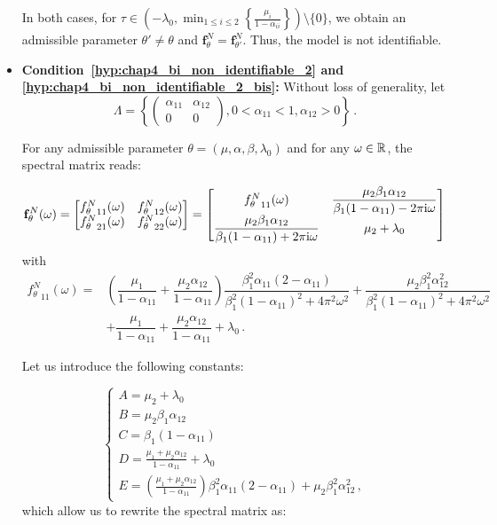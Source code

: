 \begin{subappendices}
\begin{itemize}
In both cases, for $\tau \in\left(-\lambda_0, \min_{1\leq i \leq 2}\left\{\frac{\mu_i}{1-\alpha_{ii}}\right\} \right)\setminus\{0\}$, we obtain an admissible parameter $\theta' \neq \theta$ and
$\mathbf{f}_\theta^N = \mathbf{f}_{\theta'}^N$.
Thus, the model is not identifiable.






\item \textbf{Condition~\ref{hyp:chap4_bi_non_identifiable_2} and \ref{hyp:chap4_bi_non_identifiable_2_bis}:} 
Without loss of generality, let 
\[\Lambda = \left\{ \begin{pmatrix} \alpha_{11} & \alpha_{12} \\ 0 & 0 \end{pmatrix}, 0 < \alpha_{11} < 1, \alpha_{12} > 0 \right\}\,.\] 

For any admissible parameter $\theta = (\mu, \alpha, \beta, \lambda_0)$ and for any $\omega\in{\mathbb R}$, the spectral matrix reads: 

\begin{equation*}
\mathbf{f}_\theta^N(\omega) = 
\begin{bmatrix}
  {f_\theta^N}_{11}(\omega) & {f_\theta^N}_{12}(\omega)\\
  {f_\theta^N}_{21}(\omega) & {f_\theta^N}_{22}(\omega)
\end{bmatrix}	=
\begin{bmatrix}
  {f_\theta^N}_{11}(\omega) &  \dfrac{\mu_2 \beta_1 \alpha_{12}}{\beta_1(1-\alpha_{11}) - 2 \pi \mathrm{i} \omega}\\
   \dfrac{\mu_2 \beta_1 \alpha_{12}}{\beta_1(1-\alpha_{11}) + 2 \pi \mathrm{i} \omega} & \mu_2 + \lambda_0
\end{bmatrix}
\end{equation*}
with 
\begin{align*}
{f_\theta^N}_{11}(\omega) = &\left(\dfrac{\mu_1}{1-\alpha_{11}} + \dfrac{\mu_2\alpha_{12}}{1-\alpha_{11}} \right)\dfrac{\beta_1^2 \alpha_{11}(2-\alpha_{11})}{\beta_1^2 (1-\alpha_{11})^2 + 4 \pi^2\omega^2} + \dfrac{\mu_2 \beta_1^2 \alpha_{12}^2}{\beta_1^2 (1-\alpha_{11})^2 + 4 \pi^2\omega^2} \\
&+ \dfrac{\mu_1}{1-\alpha_{11}} + \dfrac{\mu_2\alpha_{12}}{1-\alpha_{11}} + \lambda_0\,.
\end{align*}

Let us introduce the following constants:

\begin{equation*}
\begin{cases}
  A = \mu_2 + \lambda_0\\
  B = \mu_2 \beta_1 \alpha_{12}\\
  C = \beta_1 (1-\alpha_{11})\\
  D = \frac{\mu_1 + \mu_2 \alpha_{12}}{1-\alpha_{11}} + \lambda_0\\
  E = (\frac{\mu_1 + \mu_2 \alpha_{12}}{1-\alpha_{11}} ) \beta_1^2 \alpha_{11} (2-\alpha_{11}) + \mu_2 \beta_1^2 \alpha_{12}^2\,,
\end{cases}
\end{equation*}
which allow us to rewrite the spectral matrix as:


\end{itemize}
\end{subappendices}
